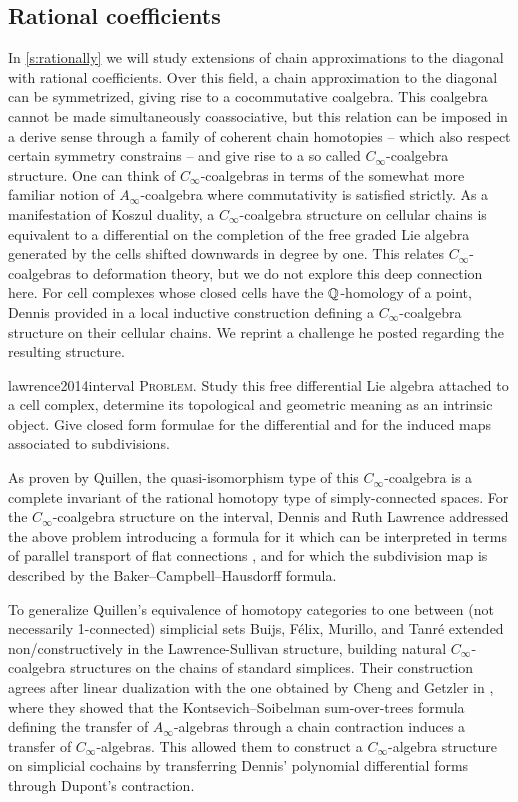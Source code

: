 \subsection*{Rational coefficients}

In \cref{s:rationally} we will study extensions of chain approximations to the diagonal with rational coefficients.
Over this field, a chain approximation to the diagonal can be symmetrized, giving rise to a cocommutative coalgebra.
This coalgebra cannot be made simultaneously coassociative, but this relation can be imposed in a derive sense through a family of coherent chain homotopies -- which also respect certain symmetry constrains -- and give rise to a so called $C_\infty$-coalgebra structure.
One can think of $C_\infty$-coalgebras in terms of the somewhat more familiar notion of $A_\infty$-coalgebra where commutativity is satisfied strictly.
As a manifestation of Koszul duality, a $C_\infty$-coalgebra structure on cellular chains is equivalent to a differential on the completion of the free graded Lie algebra generated by the cells shifted downwards in degree by one.
This relates $C_\infty$-coalgebras to deformation theory, but we do not explore this deep connection here.
For cell complexes whose closed cells have the $\mathbb{Q}$-homology of a point, Dennis provided in \cite{sullivan2007appendix} a local inductive construction defining a $C_\infty$-coalgebra structure on their cellular chains.
We reprint a challenge he posted regarding the resulting structure.
\begin{displaycquote}[p.2]{lawrence2014interval}
	\textsc{Problem}. Study this free differential Lie algebra attached to a cell complex, determine its topological and geometric meaning as an intrinsic object.
	Give closed form formulae for the differential and for the induced maps associated to subdivisions.
\end{displaycquote}
As proven by Quillen, the quasi-isomorphism type of this $C_\infty$-coalgebra is a complete invariant of the rational homotopy type of simply-connected spaces.
For the $C_\infty$-coalgebra structure on the interval, Dennis and Ruth Lawrence addressed the above problem introducing a formula for it which can be interpreted in terms of parallel transport of flat connections \cite{lawrence2014interval}, and for which the subdivision map is described by the
Baker--Campbell--Hausdorff formula.

To generalize Quillen's equivalence of homotopy categories to one between (not necessarily 1-connected) simplicial sets Buijs, F{\'e}lix, Murillo, and Tanr{\'e} extended non\-/constructively in \cite{buijs2020liemodels} the Lawrence-Sullivan structure, building natural $C_\infty$-coalgebra structures on the chains of standard simplices.
Their construction agrees after linear dualization with the one obtained by Cheng and Getzler in \cite{getzler2008transfering}, where they showed that the Kontsevich--Soibelman sum-over-trees formula defining the transfer of $A_\infty$-algebras through a chain contraction induces a transfer of $C_\infty$-algebras.
This allowed them to construct a $C_\infty$-algebra structure on simplicial cochains by transferring Dennis' polynomial differential forms through Dupont's contraction.

